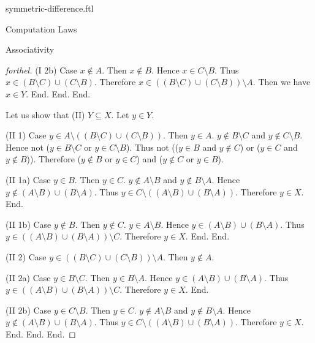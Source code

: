 \documentclass{naproche-library}
\begin{document}
\begin{smodule}[title=Symmetric Difference]{symmetric-difference.ftl}
\begin{sfragment}{Computation Laws}
\begin{sfragment}{Associativity}
\begin{proof}[forthel]
          (I 2b) Case $x \notin A$.
            Then $x \notin B$.
            Hence $x \in C \setminus B$.
            Thus $x \in (B \setminus C) \cup (C \setminus B)$.
            Therefore $x \in ((B \setminus C) \cup (C \setminus B)) \setminus A$.
            Then we have $x \in Y$.
          End.
        End.
      End.

      Let us show that (II) $Y \subseteq X$.
        Let $y \in Y$.

        (II 1) Case $y \in A \setminus ((B \setminus C) \cup (C \setminus B))$.
          Then $y \in A$.
          $y \notin B \setminus C$ and $y \notin C \setminus B$.
          Hence not ($y \in B \setminus C$ or $y \in C \setminus B$).
          Thus not (($y \in B$ and $y \notin C$) or ($y \in C$ and $y \notin B$)).
          Therefore ($y \notin B$ or $y \in C$) and ($y \notin C$ or $y \in B$).

          (II 1a) Case $y \in B$.
            Then $y \in C$.
            $y \notin A \setminus B$ and $y \notin B \setminus A$.
            Hence $y \notin (A \setminus B) \cup (B \setminus A)$.
            Thus $y \in C \setminus ((A \setminus B) \cup (B \setminus A))$.
            Therefore $y \in X$.
          End.

          (II 1b) Case $y \notin B$.
            Then $y \notin C$.
            $y \in A \setminus B$.
            Hence $y \in (A \setminus B) \cup (B \setminus A)$.
            Thus $y \in ((A \setminus B) \cup (B \setminus A)) \setminus C$.
            Therefore $y \in X$.
          End.
        End.

        (II 2) Case $y \in ((B \setminus C) \cup (C \setminus B)) \setminus A$.
          Then $y \notin A$.

          (II 2a) Case $y \in B \setminus C$.
            Then $y \in B \setminus A$.
            Hence $y \in (A \setminus B) \cup (B \setminus A)$.
            Thus $y \in ((A \setminus B) \cup (B \setminus A)) \setminus C$.
            Therefore $y \in X$.
          End.

          (II 2b) Case $y \in C \setminus B$.
            Then $y \in C$.
            $y \notin A \setminus B$ and $y \notin B \setminus A$.
            Hence $y \notin (A \setminus B) \cup (B \setminus A)$.
            Thus $y \in C \setminus ((A \setminus B) \cup (B \setminus A))$.
            Therefore $y \in X$.
          End.
        End.
      End.
    \end{proof}
  \end{sfragment}


\end{sfragment}
\end{smodule}
\end{document}
